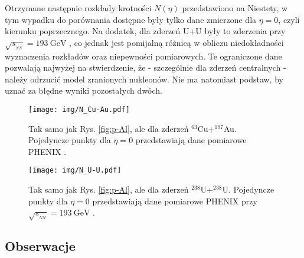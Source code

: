 \documentclass[a4paper,12pt]{article}
\begin{document}
Otrzymane następnie rozkłady krotności $N(\eta)$ przedstawiono na  Niestety, w tym wypadku do porównania dostępne były tylko dane zmierzone dla $\eta = 0$, czyli kierunku poprzecznego. Na dodatek, dla zderzeń U+U były to zderzenia przy $\sqrt{s_{_{NN}}} = 193~\text{GeV}$ \cite{Adare:2015bua}, co jednak jest pomijalną różnicą w obliczu niedokładności wyznaczenia rozkładów oraz niepewności pomiarowych. Te ograniczone dane pozwalają najwyżej na stwierdzenie, że - szczególnie dla zderzeń centralnych - należy odrzucić model zranionych nukleonów. Nie ma natomiast podstaw, by uznać za błędne wyniki pozostałych dwóch.

\begin{figure}[H]
\begin{center}
\texttt{[image: img/N\_Cu-Au.pdf]}
\caption{Tak samo jak Rys. \ref{fig:p-Al}, ale dla zderzeń $^{63}$Cu+$^{197}$Au. Pojedyncze punkty dla $\eta=0$ przedstawiają dane pomiarowe PHENIX \cite{Adare:2015bua}.}\label{fig:Cu-Au}
\end{center}
\end{figure}
\begin{figure}[H]
\begin{center}
\texttt{[image: img/N\_U-U.pdf]}
\caption{Tak samo jak Rys. \ref{fig:p-Al}, ale dla zderzeń $^{238}$U+$^{238}$U. Pojedyncze punkty dla $\eta=0$ przedstawiają dane pomiarowe PHENIX przy $\sqrt{s_{_{NN}}} = 193~\text{GeV}$ \cite{Adare:2015bua}.}\label{fig:U-U}
\end{center}
\end{figure}


\subsection{Obserwacje}
\end{document}
